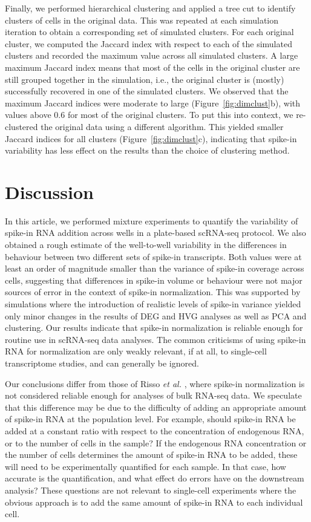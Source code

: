 \documentclass{article}
\begin{document}
Finally, we performed hierarchical clustering and applied a tree cut to identify clusters of cells in the original data.
This was repeated at each simulation iteration to obtain a corresponding set of simulated clusters.
For each original cluster, we computed the Jaccard index with respect to each of the simulated clusters and recorded the maximum value across all simulated clusters.
A large maximum Jaccard index means that most of the cells in the original cluster are still grouped together in the simulation,
i.e., the original cluster is (mostly) successfully recovered in one of the simulated clusters.
We observed that the maximum Jaccard indices were moderate to large (Figure~\ref{fig:dimclust}b), with values above 0.6 for most of the original clusters.
To put this into context, we re-clustered the original data using a different algorithm.
This yielded smaller Jaccard indices for all clusters (Figure~\ref{fig:dimclust}c), indicating that spike-in variability has less effect on the results than the choice of clustering method.

\section{Discussion}
In this article, we performed mixture experiments to quantify the variability of spike-in RNA addition across wells in a plate-based scRNA-seq protocol.
We also obtained a rough estimate of the well-to-well variability in the differences in behaviour between two different sets of spike-in transcripts.
Both values were at least an order of magnitude smaller than the variance of spike-in coverage across cells, suggesting that differences in spike-in volume or behaviour were not major sources of error in the context of spike-in normalization.
This was supported by simulations where the introduction of realistic levels of spike-in variance yielded only minor changes in the results of DEG and HVG analyses as well as PCA and clustering.
Our results indicate that spike-in normalization is reliable enough for routine use in scRNA-seq data analyses.
The common criticisms of using spike-in RNA for normalization are only weakly relevant, if at all, to single-cell transcriptome studies, and can generally be ignored.

Our conclusions differ from those of Risso \textit{et al.} \cite{risso2014normalization}, where spike-in normalization is not considered reliable enough for analyses of bulk RNA-seq data.
We speculate that this difference may be due to the difficulty of adding an appropriate amount of spike-in RNA at the population level.
For example, should spike-in RNA be added at a constant ratio with respect to the concentration of endogenous RNA, or to the number of cells in the sample?
If the endogenous RNA concentration or the number of cells determines the amount of spike-in RNA to be added, these will need to be experimentally quantified for each sample.
In that case, how accurate is the quantification, and what effect do errors have on the downstream analysis?
These questions are not relevant to single-cell experiments where the obvious approach is to add the same amount of spike-in RNA to each individual cell.
\end{document}
